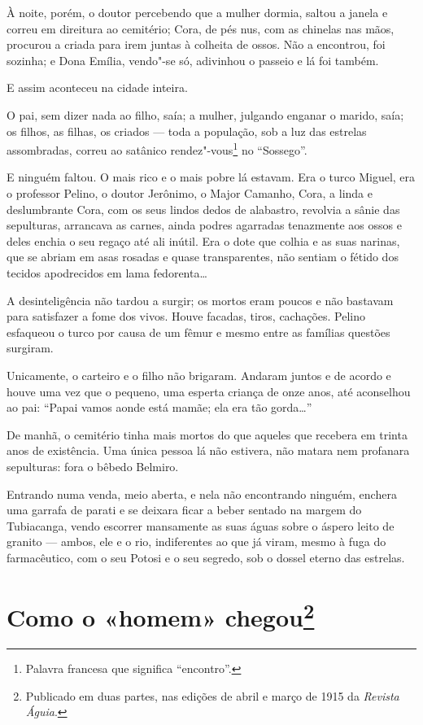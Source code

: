 À noite, porém, o doutor percebendo que a mulher dormia, saltou a janela
e correu em direitura ao cemitério; Cora, de pés nus, com as chinelas
nas mãos, procurou a criada para irem juntas à colheita de ossos. Não a
encontrou, foi sozinha; e Dona Emília, vendo"-se só, adivinhou o passeio
e lá foi também.

E assim aconteceu na cidade inteira.

O pai, sem dizer nada ao filho, saía; a mulher, julgando enganar o
marido, saía; os filhos, as filhas, os criados --- toda a população, sob
a luz das estrelas assombradas, correu ao satânico rendez"-vous\footnote{Palavra
  francesa que significa ``encontro''.} no ``Sossego''.

E ninguém faltou. O mais rico e o mais pobre lá estavam. Era o turco
Miguel, era o professor Pelino, o doutor Jerônimo, o Major Camanho,
Cora, a linda e deslumbrante Cora, com os seus lindos dedos de
alabastro, revolvia a sânie das sepulturas, arrancava as carnes, ainda
podres agarradas tenazmente aos ossos e deles enchia o seu regaço até
ali inútil. Era o dote que colhia e as suas narinas, que se abriam em
asas rosadas e quase transparentes, não sentiam o fétido dos tecidos
apodrecidos em lama fedorenta\ldots{}

A desinteligência não tardou a surgir; os mortos eram poucos e não
bastavam para satisfazer a fome dos vivos. Houve facadas, tiros,
cachações. Pelino esfaqueou o turco por causa de um fêmur e mesmo entre
as famílias questões surgiram.

Unicamente, o carteiro e o filho não brigaram. Andaram juntos e de
acordo e houve uma vez que o pequeno, uma esperta criança de onze anos,
até aconselhou ao pai: ``Papai vamos aonde está mamãe; ela era tão
gorda\ldots{}''

De manhã, o cemitério tinha mais mortos do que aqueles que recebera em
trinta anos de existência. Uma única pessoa lá não estivera, não matara
nem profanara sepulturas: fora o bêbedo Belmiro.

Entrando numa venda, meio aberta, e nela não encontrando ninguém,
enchera uma garrafa de parati e se deixara ficar a beber sentado na
margem do Tubiacanga, vendo escorrer mansamente as suas águas sobre o
áspero leito de granito --- ambos, ele e o rio, indiferentes ao que já
viram, mesmo à fuga do farmacêutico, com o seu Potosi e o seu segredo,
sob o dossel eterno das estrelas.



\chapter[Como o «homem» chegou]{Como o «homem» chegou\footnote[*]{Publicado em duas partes, nas edições de abril e março de 1915 da \emph{Revista Águia}.}}


